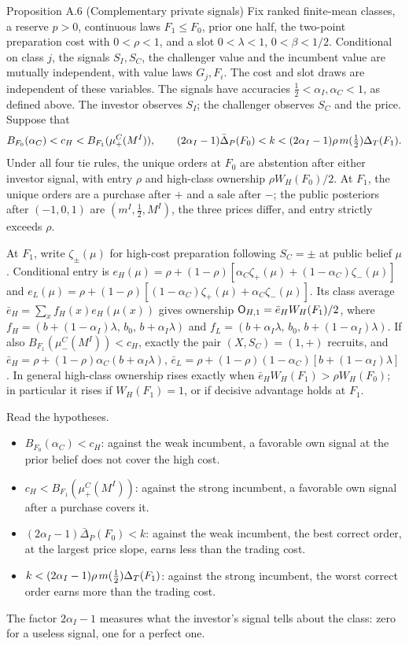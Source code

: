 \begin{paperresult}{Proposition A.6 (Complementary private signals)}
Fix ranked finite-mean classes, a reserve \(p>0\), continuous laws \(F_1\le F_0\), prior one half, the two-point preparation cost with \(0<\rho<1\), and a slot \(0<\lambda<1\), \(0<\beta<1/2\). Conditional on class \(j\), the signals \(S_I,S_C\), the challenger value and the incumbent value are mutually independent, with value laws \(G_j,F_i\). The cost and slot draws are independent of these variables. The signals have accuracies \(\tfrac12<\alpha_I,\alpha_C<1\), as defined above. The investor observes \(S_I\); the challenger observes \(S_C\) and the price. Suppose that
\[
B_{F_0}(\alpha_C)<c_H<B_{F_1}(\mu^C_+(M^I)),\qquad
(2\alpha_I-1)\bar\Delta_P(F_0)<k<(2\alpha_I-1)\rho\,m(\tfrac12)\Delta_T(F_1).
\]
Under all four tie rules, the unique orders at \(F_0\) are abstention after either investor signal, with entry \(\rho\) and high-class ownership \(\rho W_H(F_0)/2\). At \(F_1\), the unique orders are a purchase after \(+\) and a sale after \(-\); the public posteriors after \((-1,0,1)\) are \((m^I,\tfrac12,M^I)\), the three prices differ, and entry strictly exceeds \(\rho\).

At \(F_1\), write \(\zeta_\pm(\mu)\) for high-cost preparation following \(S_C=\pm\) at public belief \(\mu\). Conditional entry is
\(e_H(\mu)=\rho+(1-\rho)[\alpha_C\zeta_+(\mu)+(1-\alpha_C)\zeta_-(\mu)]\) and \(e_L(\mu)=\rho+(1-\rho)[(1-\alpha_C)\zeta_+(\mu)+\alpha_C\zeta_-(\mu)]\). Its class average \(\bar e_H=\sum_xf_H(x)e_H(\mu(x))\) gives ownership \(\mathsf{O}_{H,1}=\bar e_HW_H(F_1)/2\), where \(f_H=(b+(1-\alpha_I)\lambda,\,b_0,\,b+\alpha_I\lambda)\) and \(f_L=(b+\alpha_I\lambda,\,b_0,\,b+(1-\alpha_I)\lambda)\).
If also \(B_{F_1}(\mu^C_-(M^I))<c_H\), exactly the pair \((X,S_C)=(1,+)\) recruits, and \(\bar e_H=\rho+(1-\rho)\alpha_C(b+\alpha_I\lambda)\), \(\bar e_L=\rho+(1-\rho)(1-\alpha_C)[b+(1-\alpha_I)\lambda]\).
In general high-class ownership rises exactly when \(\bar e_HW_H(F_1)>\rho W_H(F_0)\); in particular it rises if \(W_H(F_1)=1\), or if decisive advantage holds at \(F_1\).
\end{paperresult}

Read the hypotheses.
\begin{itemize}
\item \(B_{F_0}(\alpha_C)<c_H\): against the weak incumbent, a favorable own signal at the prior belief does not cover the high cost.
\item \(c_H<B_{F_1}(\mu^C_+(M^I))\): against the strong incumbent, a favorable own signal after a purchase covers it.
\item \((2\alpha_I-1)\bar\Delta_P(F_0)<k\): against the weak incumbent, the best correct order, at the largest price slope, earns less than the trading cost.
\item \(k<(2\alpha_I-1)\rho\,m(\tfrac12)\Delta_T(F_1)\): against the strong incumbent, the worst correct order earns more than the trading cost.
\end{itemize}
The factor \(2\alpha_I-1\) measures what the investor's signal tells about the class: zero for a useless signal, one for a perfect one.

